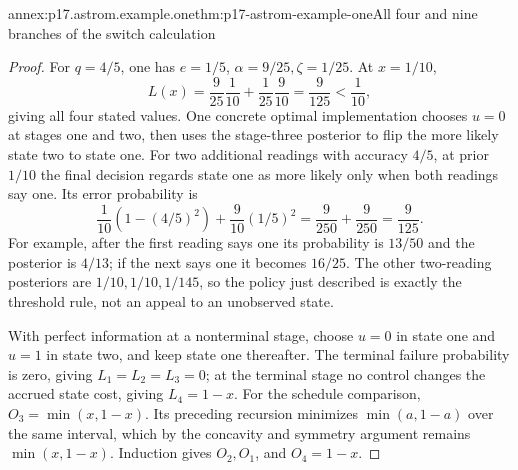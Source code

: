 \begin{annexitem}{annex:p17.astrom.example.one}{thm:p17-astrom-example-one}{All four and nine branches of the switch calculation}
\begin{proof}
For \(q=4/5\), one has \(e=1/5\),
\(\alpha=9/25,\zeta=1/25\).
At \(x=1/10\),
\[
 L(x)=\frac9{25}\frac1{10}
       +\frac1{25}\frac9{10}
       =\frac9{125}<\frac1{10},
\]
giving all four stated values.
One concrete optimal implementation chooses \(u=0\)
at stages one and two, then uses the stage-three
posterior to flip the more likely state two to state one.
For two additional readings with accuracy \(4/5\),
at prior \(1/10\) the final decision regards state
one as more likely only when both readings say one.
Its error probability is
\[
       \frac1{10}(1-(4/5)^2)
              +\frac9{10}(1/5)^2
                       =\frac9{250}+\frac9{250}=\frac9{125}.
\]
For example, after the first reading says one its
probability is \(13/50\) and the posterior is \(4/13\);
if the next says one it becomes \(16/25\).
The other two-reading posteriors are \(1/10,1/10,1/145\),
so the policy just described is exactly the threshold
rule, not an appeal to an unobserved state.

With perfect information at a nonterminal stage,
choose \(u=0\) in state one and \(u=1\) in state two,
and keep state one thereafter. The terminal failure
probability is zero, giving \(L_1=L_2=L_3=0\);
at the terminal stage no control changes the accrued
state cost, giving \(L_4=1-x\).
For the schedule comparison, \(O_3=\min(x,1-x)\).
Its preceding recursion minimizes
\(\min(a,1-a)\) over the same interval, which by the
concavity and symmetry argument remains \(\min(x,1-x)\).
Induction gives \(O_2,O_1\), and \(O_4=1-x\).
\end{proof}
\end{annexitem}

